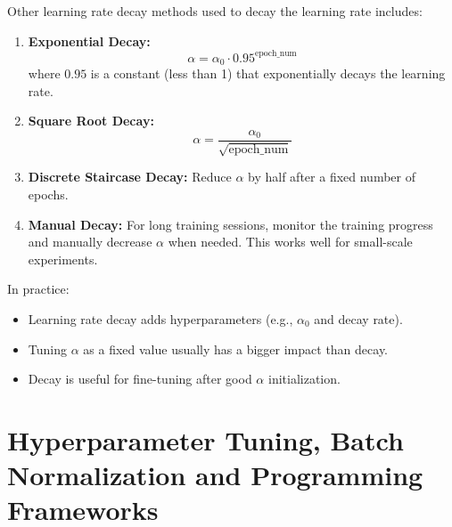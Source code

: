 \documentclass[letterpaper,12pt,notitlepage,twoside]{report}
\begin{document}
Other learning rate decay methods used to decay the learning rate includes:
\begin{enumerate}
    \item \textbf{Exponential Decay:}
    \[
    \alpha = \alpha_0 \cdot 0.95^{\text{epoch\_num}}
    \]
    where \( 0.95 \) is a constant (less than 1) that exponentially decays the learning rate.

    \item \textbf{Square Root Decay:}
    \[
    \alpha = \frac{\alpha_0}{\sqrt{\text{epoch\_num}}}
    \]

    \item \textbf{Discrete Staircase Decay:}
    Reduce \( \alpha \) by half after a fixed number of epochs.

    \item \textbf{Manual Decay:}
    For long training sessions, monitor the training progress and manually decrease \( \alpha \) when needed. This works well for small-scale experiments.
\end{enumerate}

In practice:
\begin{itemize}[noitemsep, topsep=0pt]
	\item Learning rate decay adds hyperparameters (e.g., \(\alpha_0\) and decay rate).
	\item Tuning \(\alpha\) as a fixed value usually has a bigger impact than decay.
	\item Decay is useful for fine-tuning after good \(\alpha\) initialization.
\end{itemize}

\section{Hyperparameter Tuning, Batch Normalization and Programming Frameworks}
\end{document}
